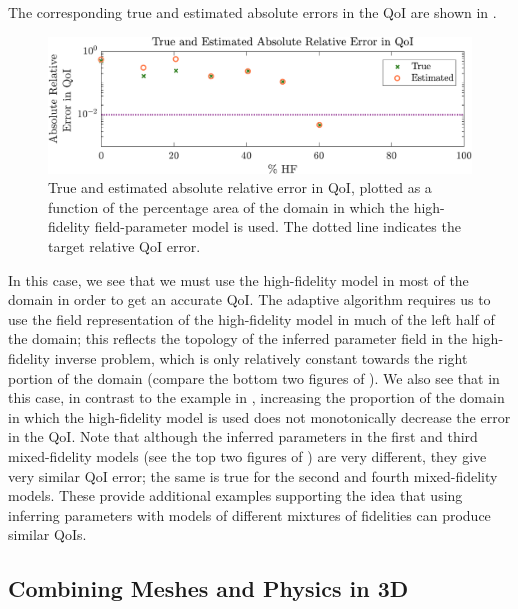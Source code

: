 \documentclass[review,sort&compress]{elsarticle}
\theoremstyle{plain} %
\theoremstyle{definition} %
\begin{document}
%
The corresponding true and estimated absolute errors in the QoI are shown in .
%
\begin{figure}[htbp]
\centering
\includegraphics[width=\textwidth]{svf/err_est_v2.pdf}
\caption{True and estimated absolute relative error in QoI, plotted as a function of the percentage area of the domain in which the high-fidelity field-parameter model is used. The dotted line indicates the target relative QoI error.}
\label{fig:svfErr}
\end{figure}
%
In this case, we see that we must use the high-fidelity model in most of the domain in order to get an accurate QoI. The adaptive algorithm requires us to use the field representation of the high-fidelity model in much of the left half of the domain; this reflects the topology of the inferred parameter field in the high-fidelity inverse problem, which is only relatively constant towards the right portion of the domain (compare the bottom two figures of ). We also see that in this case, in contrast to the example in , increasing the proportion of the domain in which the high-fidelity model is used does not monotonically decrease the error in the QoI. Note that although the inferred parameters in the first and third mixed-fidelity models (see the top two figures of ) are very different, they give very similar QoI error; the same is true for the second and fourth mixed-fidelity models. These provide additional examples supporting the idea that using inferring parameters with models of different mixtures of fidelities can produce similar QoIs.

\subsection{Combining Meshes and Physics in 3D} \label{sec:diffvcdr3D}
\end{document}
